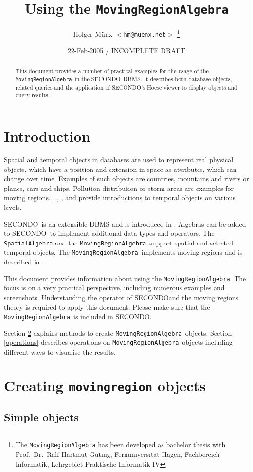 \documentclass[a4paper,12pt]{article}
\title{Using the {\tt MovingRegionAlgebra}}
\author{Holger M\"{u}nx {\tt $<$hm@muenx.net$>$}
    \thanks{The {\tt MovingRegionAlgebra} has been developed
    as bachelor thesis with Prof.\ Dr.\ Ralf Hartmut G\"{u}ting,
    Fernuniversit\"{a}t Hagen, Fachbereich Informatik, 
    Lehrgebiet Praktische Informatik IV}}
\date{22-Feb-2005 / INCOMPLETE DRAFT}
\newcommand{\secondo}{{\scshape SE\-CON\-DO}}
\newcommand{\mra}{{\tt Moving\-Region\-Algebra}}
\begin{document}
\maketitle

\begin{abstract}
This document provides a number of practical examples for the usage
of the \mra\ in the \secondo\ DBMS. It describes
both database objects, related queries and the application of
\secondo's Hoese viewer to display objects and query results.
\end{abstract}

\section{Introduction}

Spatial and temporal objects in databases are used to represent
real physical objects, which have a position and extension in space
as attributes, which can change over time. Examples of such objects
are countries, mountains and rivers or planes, cars and ships.
Pollution distribution or storm areas are examples for moving
regions. \cite{GuS04}, \cite{EGS+99}, \cite{GBE+00}, \cite{FGN+00}
and \cite{LFG03}
provide introductions to temporal objects on various levels.

\secondo\ is an extensible DBMS and is introduced in \cite{DiG99}.
Algebras can be added to \secondo\ to implement additional data types
and operators. The {\tt SpatialAlgebra}
and the \mra\ support spatial and selected temporal
objects. The \mra\ implements moving regions and
is described in \cite{Mue05}.

This document provides information about using the \mra. The
focus is on a very practical perspective, including numerous examples
and screenshots. Understanding the operator of \secondo and the moving
regions theory is required to apply this document. Please make sure that
the \mra\ is included in \secondo.

Section \ref{creating} explains methods to create
\mra\ objects. Section \ref{operations} describes operations on
\mra\ objects including different ways to visualise the results.

\section{Creating {\tt movingregion} objects}
\label{creating}

\subsection{Simple objects}
\end{document}
